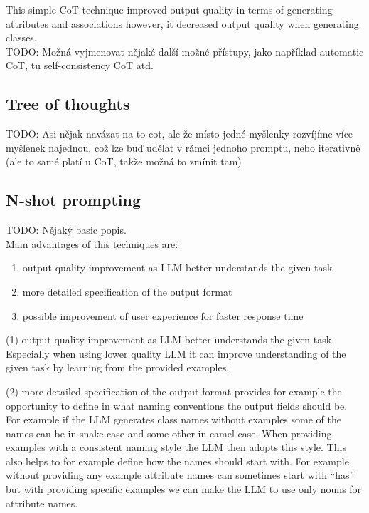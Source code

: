 This simple CoT technique improved output quality in terms of generating attributes and associations however, it decreased output quality when generating classes. \\

TODO: Možná vyjmenovat nějaké další možné přístupy, jako například automatic CoT, tu self-consistency CoT atd. \\


\subsection{Tree of thoughts}

TODO: Asi nějak navázat na to cot, ale že místo jedné myšlenky rozvíjíme více myšlenek najednou, což lze buď udělat v rámci jednoho promptu, nebo iterativně (ale to samé platí u CoT, takže možná to zmínit tam)


\subsection{N-shot prompting}

TODO: Nějaký basic popis. \\

Main advantages of this techniques are:

\begin{enumerate}
\item output quality improvement as LLM better understands the given task
\item more detailed specification of the output format
\item possible improvement of user experience for faster response time
\end{enumerate}

(1) output quality improvement as LLM better understands the given task. Especially when using lower quality LLM it can improve understanding of the given task by learning from the provided examples.

(2) more detailed specification of the output format provides for example the opportunity to define in what naming conventions the output fields should be. For example if the LLM generates class names without examples some of the names can be in snake case and some other in camel case. When providing examples with a consistent naming style the LLM then adopts this style. This also helps to for example define how the names should start with. For example without providing any example attribute names can sometimes start with ``has'' but with providing specific examples we can make the LLM to use only nouns for attribute names. \\

